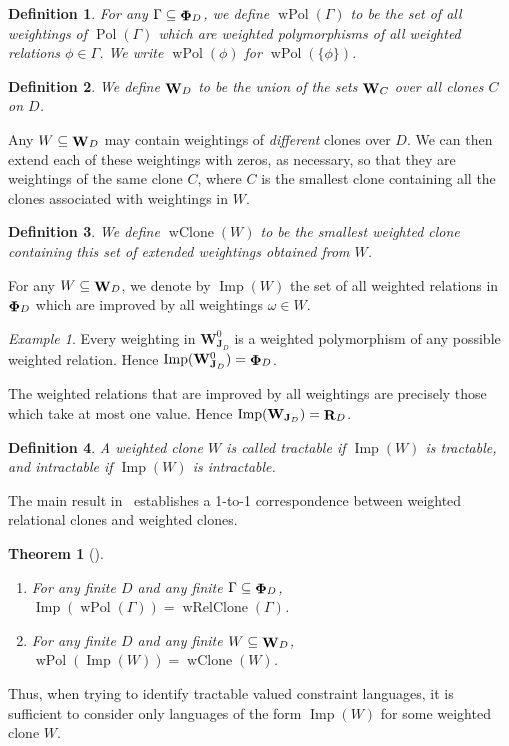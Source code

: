 \documentclass[11pt, reqno]{article}
\DeclareMathOperator{\wops}{{\bf W}}
\DeclareMathOperator{\wpol}{wPol}
\DeclareMathOperator{\rel}{{\bf R}}
\DeclareMathOperator{\wrel}{{\bf \Phi}}
\DeclareMathOperator{\wclone}{wClone}
\DeclareMathOperator{\imp}{Imp}
\DeclareMathOperator{\pol}{Pol}
\DeclareMathOperator{\wrelclone}{wRelClone}
\newtheorem{theorem}{Theorem}%
\newtheorem{definition}{Definition}
\theoremstyle{remark}
\newtheorem{example}{Example}
\begin{document}
\begin{definition}
For any $\Gamma \subseteq \wrel_D$, we define $\wpol(\Gamma)$ to be the set of all
weightings of $\pol(\Gamma)$ which are weighted polymorphisms of all weighted
relations $\phi \in \Gamma$. We write $\wpol(\phi)$ for $\wpol(\{\phi\})$.
\end{definition}


\begin{definition}
We define $\wops_D$ to be the union of the sets $\wops_C$ over all clones $C$ on $D$.
\end{definition}

%
Any $W \subseteq \wops_D$ may contain weightings of \emph{different}
clones over $D$. We can then  extend each of these weightings with zeros, as
necessary, so that they are weightings of the same clone $C$, where $C$ is the
smallest clone containing all the clones associated with weightings in $W$.

\begin{definition}
We define $\wclone(W)$ to be the smallest weighted clone
containing this set of extended weightings obtained from $W$.
\end{definition}

For any $W \subseteq \wops_D$,
we denote by $\imp(W)$ the set of all weighted relations in $\wrel_D$ which are
improved by all weightings $\omega \in W$.

\begin{example}
Every weighting in $\mathbf{W}_{\mathbf{J}_D}^0$ is a weighted polymorphism of
any possible weighted relation. Hence $\imp(\mathbf{W}_{\mathbf{J}_D}^0)=\wrel_D$.

The weighted relations that are improved by all weightings are precisely those
which take at most one value. Hence $\imp(\mathbf{W}_{\mathbf{J}_D})=\rel_D$.
\end{example}

\begin{definition}
A weighted clone $W$ is called \emph{tractable} if $\imp(W)$ is tractable, and
intractable if $\imp(W)$ is intractable.
\end{definition}

The main result in~\cite{cccjz13:sicomp} establishes a 1-to-1 
correspondence between weighted relational clones and weighted clones.
%
\begin{theorem}[\hspace*{-0.3em}\cite{cccjz13:sicomp}]~\label{thm:wgc}
\begin{enumerate}
\item
For any finite $D$ and any finite $\Gamma \subseteq \wrel_D$, $\imp(\wpol(\Gamma)) = \wrelclone(\Gamma)$.
\item
For any finite $D$ and any finite $W\subseteq \wops_D$, $\wpol(\imp(W)) = \wclone(W)$.
\end{enumerate}
\end{theorem}
%
Thus, when trying to identify tractable valued constraint languages, it is
sufficient to consider only languages of the form $\imp(W)$ for some weighted clone $W$.
\end{document}
